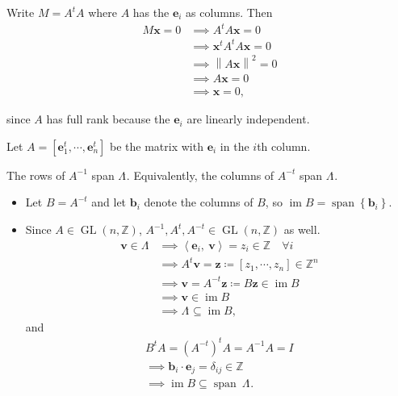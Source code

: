 \begin{solution}[Alternative]

Write \(M = A^tA\) where \(A\) has the \(\mathbf{e}_i\) as columns. Then
\begin{align*}
M\mathbf{x} = 0 
&\implies A^t A \mathbf{x} = 0 \\
&\implies \mathbf{x}^t A^t A \mathbf{x} = 0 \\
&\implies {\left\lVert {A \mathbf{x}} \right\rVert}^2  = 0 \\
&\implies A\mathbf{x} = 0 \\
&\implies \mathbf{x} = 0
,\end{align*}

since \(A\) has full rank because the \(\mathbf{e}_i\) are linearly
independent.

Let \(A = [\mathbf{e}_1^t, \cdots, \mathbf{e}_n^t]\) be the matrix with
\(\mathbf{e}_i\) in the \(i\)th column.

\begin{claim}

The rows of \(A^{-1}\) span \(\Lambda {}^{ \check{} }\). Equivalently,
the columns of \(A^{-t}\) span \(\Lambda {}^{ \check{} }\).

\end{claim}

\begin{itemize}
\item
  Let \(B = A^{-t}\) and let \(\mathbf{b}_i\) denote the columns of
  \(B\), so
  \(\operatorname{im}B = {\operatorname{span}}{\left\{{\mathbf{b}_i}\right\}}\).
\item
  Since \(A \in \operatorname{GL}(n, {\mathbb{Z}})\),
  \(A^{-1}, A^t, A^{-t} \in \operatorname{GL}(n, {\mathbb{Z}})\) as
  well.
  \begin{align*}
  \mathbf{v} \in \Lambda {}^{ \check{} }
  &\implies {\left\langle {\mathbf{e}_i},~{\mathbf{v}} \right\rangle} = z_i \in {\mathbb{Z}}\quad \forall i \\
  &\implies A^t \mathbf{v} = \mathbf{z} \coloneqq[z_1, \cdots, z_n] \in {\mathbb{Z}}^n \\
  &\implies \mathbf{v} = A^{-t} \mathbf{z} \coloneqq B\mathbf{z} \in \operatorname{im}B \\
  &\implies \mathbf{v} \in \operatorname{im}B \\
  &\implies \Lambda {}^{ \check{} }\subseteq \operatorname{im}B
  ,\end{align*}
  and
  \begin{align*}
  B^t A = (A^{-t})^t A = A^{-1}A = I \\
  \implies \mathbf{b}_i \cdot \mathbf{e}_j = \delta_{ij} \in {\mathbb{Z}}\\
  \implies \operatorname{im}B \subseteq {\operatorname{span}}~ \Lambda {}^{ \check{} }
  .\end{align*}
\end{itemize}

\end{solution}

